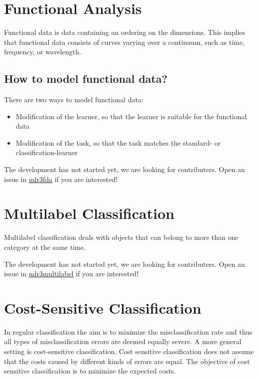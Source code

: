\documentclass[]{scrbook}
\providecommand{\tightlist}{%
  \setlength{\itemsep}{0pt}\setlength{\parskip}{0pt}}
\begin{document}
\hypertarget{functional}{%
\section{Functional Analysis}\label{functional}}

Functional data is data containing an ordering on the dimensions.
This implies that functional data consists of curves varying over a continuum, such as time, frequency, or wavelength.

\hypertarget{how-to-model-functional-data}{%
\subsection{How to model functional data?}\label{how-to-model-functional-data}}

There are two ways to model functional data:

\begin{itemize}
\tightlist
\item
  Modification of the learner, so that the learner is suitable for the functional data
\item
  Modification of the task, so that the task matches the standard- or classification-learner
\end{itemize}

The development has not started yet, we are looking for contributers.
Open an issue in \href{https://github.com/mlr-org/mlr3fda}{mlr3fda} if you are interested!

\hypertarget{multilabel}{%
\section{Multilabel Classification}\label{multilabel}}

Multilabel classification deals with objects that can belong to more than one category at the same time.

The development has not started yet, we are looking for contributers.
Open an issue in \href{https://github.com/mlr-org/mlr3multilabel}{mlr3multilabel} if you are interested!

\hypertarget{cost-sens}{%
\section{Cost-Sensitive Classification}\label{cost-sens}}

In regular classification the aim is to minimize the misclassification rate and thus all types of misclassification errors are deemed equally severe.
A more general setting is cost-sensitive classification.
Cost sensitive classification does not assume that the costs caused by different kinds of errors are equal.
The objective of cost sensitive classification is to minimize the expected costs.
\end{document}
